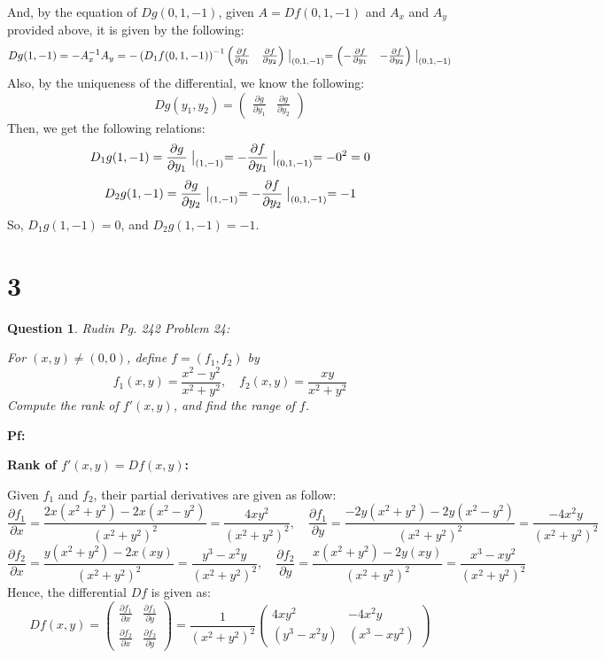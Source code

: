 \documentclass{article}
\newtheorem{question}{Question}
\begin{document}
And, by the equation of $Dg(0,1,-1)$, given $A = Df(0,1,-1)$ and $A_x$ and $A_y$ provided above, it is given by the following:
$$Dg(1,-1) = -A_x^{-1}A_y = -\left(D_1f(0,1,-1)\right)^{-1}\begin{pmatrix}\frac{\partial f}{\partial y_1} & \frac{\partial f}{\partial y_2}\end{pmatrix}\bigm|_{(0,1,-1)} = \begin{pmatrix}-\frac{\partial f}{\partial y_1} & -\frac{\partial f}{\partial y_2}\end{pmatrix}\bigm|_{(0,1,-1)}$$
Also, by the uniqueness of the differential, we know the following: 
$$Dg(y_1,y_2) = \begin{pmatrix}
    \frac{\partial g}{\partial y_1} & \frac{\partial g}{\partial y_2}
\end{pmatrix}$$
Then, we get the following relations:
$$D_1g(1,-1)=\frac{\partial g}{\partial y_1}\bigm|_{(1,-1)} = -\frac{\partial f}{\partial y_1}\bigm|_{(0,1,-1)} = -0^2 = 0$$
$$D_2g(1,-1)=\frac{\partial g}{\partial y_2}\bigm|_{(1,-1)} = -\frac{\partial f}{\partial y_2}\bigm|_{(0,1,-1)} = -1$$
So, $D_1g(1,-1)=0$, and $D_2g(1,-1)=-1$.
 
\hfil

\hfil

\section*{3}
\begin{myBox}[]{}
    \begin{question}
        Rudin Pg. 242 Problem 24:

        For $(x,y)\neq (0,0)$, define $f=(f_1,f_2)$ by 
        $$f_1(x,y)=\frac{x^2-y^2}{x^2+y^2},\quad f_2(x,y)=\frac{xy}{x^2+y^2}$$
        Compute the rank of $f'(x,y)$, and find the range of $f$.
    \end{question}
\end{myBox}

\textbf{Pf:}

\textbf{Rank of $f'(x,y)=Df(x,y)$:}

Given $f_1$ and $f_2$, their partial derivatives are given as follow:
$$\frac{\partial f_1}{\partial x} = \frac{2x(x^2+y^2)-2x(x^2-y^2)}{(x^2+y^2)^2} = \frac{4xy^2}{(x^2+y^2)^2},\quad \frac{\partial f_1}{\partial y}=\frac{-2y(x^2+y^2)-2y(x^2-y^2)}{(x^2+y^2)^2}=\frac{-4x^2y}{(x^2+y^2)^2}$$
$$\frac{\partial f_2}{\partial x}=\frac{y(x^2+y^2)-2x(xy)}{(x^2+y^2)^2}=\frac{y^3-x^2y}{(x^2+y^2)^2},\quad \frac{\partial f_2}{\partial y}=\frac{x(x^2+y^2)-2y(xy)}{(x^2+y^2)^2}=\frac{x^3-xy^2}{(x^2+y^2)^2}$$
Hence, the differential $Df$ is given as:
$$Df(x,y)=\begin{pmatrix}
    \frac{\partial f_1}{\partial x} & \frac{\partial f_1}{\partial y}\\
    \frac{\partial f_2}{\partial x} & \frac{\partial f_2}{\partial y}
\end{pmatrix}=\frac{1}{(x^2+y^2)^2}\begin{pmatrix}
    4xy^2 & -4x^2y\\
    (y^3-x^2y) & (x^3-xy^2)
\end{pmatrix}$$
\end{document}
